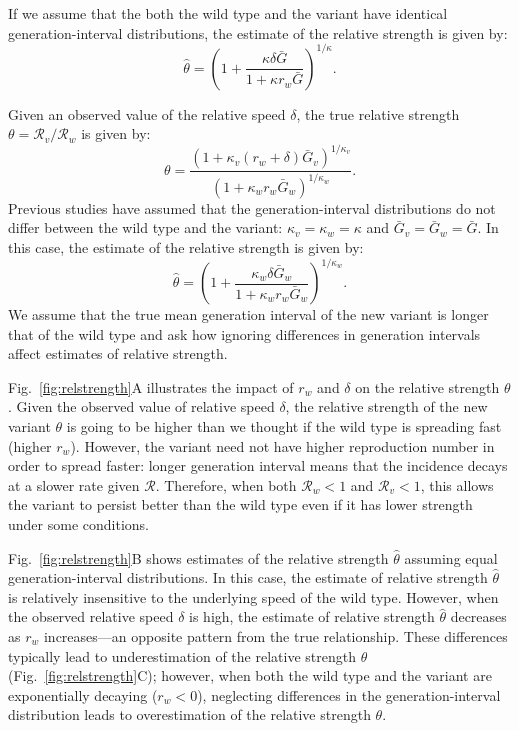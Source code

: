 \documentclass[12pt]{article}
\newcommand{\fref}[1]{Fig.~\ref{fig:#1}}
\newcommand{\RR}{\ensuremath{{\mathcal R}}\xspace}
\begin{document}
If we assume that the both the wild type and the variant have identical generation-interval distributions, the estimate of the relative strength is given by:
\begin{equation}
\hat{\theta} = \left(1 + \frac{\kappa \delta \bar{G}}{1 + \kappa r_w \bar{G}}\right)^{1/\kappa}.
\end{equation}



Given an observed value of the relative speed $\delta$, the true relative strength $\theta = \RR_v/\RR_w$ is given by:
\begin{equation}
\theta = \frac{(1 + \kappa_v (r_w + \delta) \bar{G}_v)^{1/\kappa_v}}{(1 + \kappa_w r_w \bar{G}_w)^{1/\kappa_w}}.
\end{equation}
Previous studies have assumed that the generation-interval distributions do not differ between the wild type and the variant: $\kappa_v = \kappa_w = \kappa$ and $\bar{G}_v = \bar{G}_w = \bar{G}$.
In this case, the estimate of the relative strength is given by:
\begin{equation}
\hat{\theta} = \left(1 + \frac{\kappa_w \delta \bar{G}_w}{1 + \kappa_w r_w \bar{G}_w}\right)^{1/\kappa_w}.
\end{equation}
We assume that the true mean generation interval of the new variant is longer that of the wild type and ask how ignoring differences in generation intervals affect estimates of relative strength.

\fref{relstrength}A illustrates the impact of $r_w$ and $\delta$ on the relative strength $\theta$.
Given the observed value of relative speed $\delta$,
the relative strength of the new variant $\theta$ is going to be higher than we thought if the wild type is spreading fast (higher $r_w$).
However, the variant need not have higher reproduction number in order to spread faster: longer generation interval means that the incidence decays at a slower rate given $\RR$. 
Therefore, when both $\RR_w < 1$ and $\RR_v < 1$, this allows the variant to persist better than the wild type even if it has lower strength under some conditions.

\fref{relstrength}B shows estimates of the relative strength $\hat{\theta}$ assuming equal generation-interval distributions.
In this case, the estimate of relative strength $\hat{\theta}$ is relatively insensitive to the underlying speed of the wild type.
However, when the observed relative speed $\delta$ is high, the estimate of relative strength $\hat{\theta}$ decreases as $r_w$ increases---an opposite pattern from the true relationship.
These differences typically lead to underestimation of the relative strength $\theta$ (\fref{relstrength}C);
however, when both the wild type and the variant are exponentially decaying ($r_w < 0$), neglecting differences in the generation-interval distribution leads to overestimation of the relative strength $\theta$.
\end{document}
